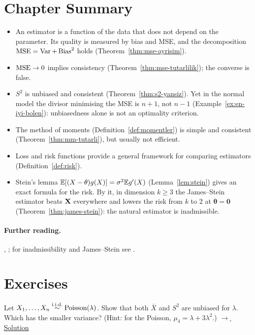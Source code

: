 \documentclass[main.tex]{subfiles}
\begin{document}
\section{Chapter Summary}
\begin{summary}
\begin{itemize}
  \item An estimator is a function of the data that does not depend on the parameter. Its quality is measured by bias and MSE, and the decomposition $\operatorname{MSE}=\operatorname{Var}+\operatorname{Bias}^2$ holds (Theorem~\ref{thm:mse-ayrisim}).
  \item $\operatorname{MSE}\to0$ implies consistency (Theorem~\ref{thm:mse-tutarlilik}); the converse is false.
  \item $S^2$ is unbiased and consistent (Theorem~\ref{thm:s2-yansiz}). Yet in the normal model the divisor minimising the MSE is $n+1$, not $n-1$ (Example~\ref{ex:en-iyi-bolen}): unbiasedness alone is not an optimality criterion.
  \item The method of moments (Definition~\ref{def:momentler}) is simple and consistent (Theorem~\ref{thm:mm-tutarli}), but usually not efficient.
  \item Loss and risk functions provide a general framework for comparing estimators (Definition~\ref{def:risk}).
  \item Stein's lemma $\mathbb{E}[(X-\theta)g(X)]=\sigma^2\mathbb{E} g'(X)$ (Lemma~\ref{lem:stein}) gives an exact formula for the risk. By it, in dimension $k\ge3$ the James--Stein estimator beats $\mathbf{X}$ everywhere and lowers the risk from $k$ to $2$ at $\bm\theta=\mathbf 0$ (Theorem~\ref{thm:james-stein}): the natural estimator is inadmissible.
\end{itemize}
\end{summary}

\paragraph{Further reading.} \cite[Chapter~7]{casella}, \cite[Chapters~1--2]{lehmann-casella}; for inadmissibility and James--Stein see \cite[Chapter~5]{lehmann-casella}.

\section{Exercises}

\begin{exercise}\label{exr:07-1}
Let $X_1,\dots,X_n\overset{\text{i.i.d.}}{\sim}\text{Poisson}(\lambda)$. Show that both $\bar X$ and $S^2$ are unbiased for $\lambda$. Which has the smaller variance? (Hint: for the Poisson, $\mu_4=\lambda+3\lambda^2$.)
\hfill\hyperref[coz:07-1]{\footnotesize$\rightarrow$\,Solution}
\end{exercise}
\end{document}
